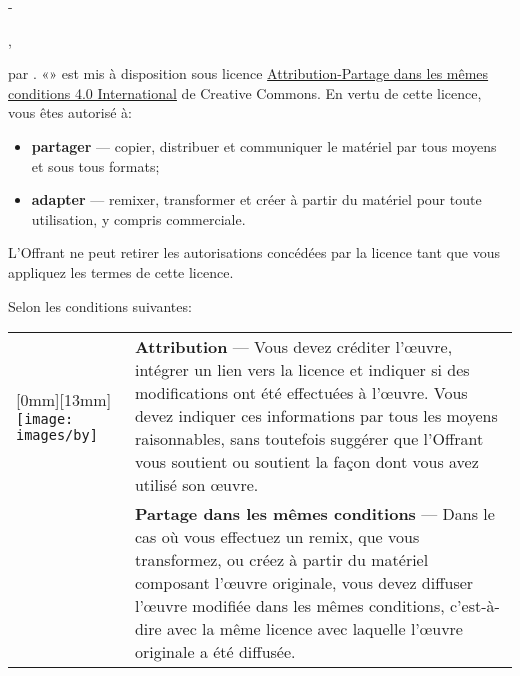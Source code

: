 
\begingroup
\calccentering{\unitlength}
\begin{adjustwidth*}{\unitlength}{-\unitlength}
  \setlength{\parindent}{0pt}
  \setlength{\parskip}{\baselineskip}
  \small

  {\theauthor}, {\year}

  {\textcopyright} {\year} par {\theauthor}. «\thetitle» est mis à
  disposition sous licence
  \href{https://creativecommons.org/licenses/by-sa/4.0/deed.fr}{%
    Attribution-Partage dans les mêmes conditions 4.0 International}
  de Creative Commons. En vertu de cette licence, vous êtes autorisé
  à:
  \begin{itemize}
  \item \textbf{partager} --- copier, distribuer et communiquer le
    matériel par tous moyens et sous tous formats;
  \item \textbf{adapter} --- remixer, transformer et créer à partir du
    matériel pour toute utilisation, y compris commerciale.
  \end{itemize}
  L'Offrant ne peut retirer les autorisations concédées par la licence
  tant que vous appliquez les termes de cette licence.

  Selon les conditions suivantes: \par
  \begin{tabularx}{\linewidth}{@{}lX@{}}
    \raisebox{-9mm}[0mm][13mm]{\texttt{[image: images/by]}}
    & \textbf{Attribution} --- Vous devez créditer l'œuvre, intégrer
      un lien vers la licence et indiquer si des modifications ont été
      effectuées à l'œuvre. Vous devez indiquer ces informations par
      tous les moyens raisonnables, sans toutefois suggérer que
      l'Offrant vous soutient ou soutient la façon dont vous avez utilisé
      son œuvre. \\
    \raisebox{-9mm}{\texttt{[image: images/sa]}}
    & \textbf{Partage dans les mêmes conditions} --- Dans le cas où vous
      effectuez un remix, que vous transformez, ou créez à partir du
      matériel composant l'œuvre originale, vous devez diffuser l'œuvre modifiée dans
      les mêmes conditions, c'est-à-dire avec la même licence avec laquelle
      l'œuvre originale a été diffusée.
  \end{tabularx}


\end{adjustwidth*}
